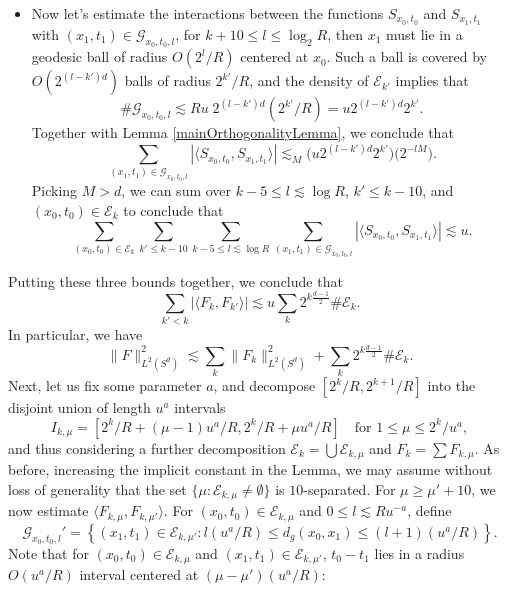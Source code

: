 \begin{itemize}
    \item Now let's estimate the interactions between the functions ${S\!}_{x_0,t_0}$ and ${S\!}_{x_1,t_1}$ with $(x_1,t_1) \in \mathcal{G}_{x_0,t_0,l}$, for $k + 10 \leq l \leq \log_2 R$, then $x_1$ must lie in a geodesic ball of radius $O(2^l/R)$ centered at $x_0$. Such a ball is covered by $O( 2^{(l-k')d} )$ balls of radius $2^{k'}/R$, and the density of $\mathcal{E}_{k'}$ implies that
    \[ \# \mathcal{G}_{x_0,t_0,l} \lesssim Ru\; 2^{(l-k')d} (2^{k'}/R) = u 2^{(l-k')d} 2^{k'}. \]
    Together with Lemma \ref{mainOrthogonalityLemma}, we conclude that
    \[ \sum_{(x_1,t_1) \in \mathcal{G}_{x_0,t_0,l}} |\langle {S\!}_{x_0,t_0}, {S\!}_{x_1,t_1} \rangle| \lesssim_M \Big( u 2^{(l-k')d} 2^{k'} \Big) \Big( 2^{-lM} \Big). \]
    Picking $M > d$, we can sum over $k - 5 \leq l \lesssim \log R$, $k' \leq k - 10$, and $(x_0,t_0) \in \mathcal{E}_k$ to conclude that
    \[ \sum_{(x_0,t_0) \in \mathcal{E}_k} \sum_{k' \leq k - 10} \sum_{k-5 \leq l \lesssim \log R} \sum_{(x_1,t_1) \in \mathcal{G}_{x_0,t_0,l}} |\langle {S\!}_{x_0,t_0}, {S\!}_{x_1,t_1} \rangle| \lesssim u. \]
\end{itemize}
%
Putting these three bounds together, we conclude that
%
\[ \sum_{k' < k} |\langle F_k, F_{k'} \rangle| \lesssim u \sum_k 2^{k \frac{d-1}{2}} \# \mathcal{E}_k. \]
%
In particular, we have
%
\[ \| F \|_{L^2(S^d)}^2 \lesssim \sum_k \| F_k \|_{L^2(S^d)}^2 + \sum_k 2^{k \frac{d-1}{2}} \# \mathcal{E}_k. \]
%
Next, let us fix some parameter $a$, and decompose $[2^k/R, 2^{k+1}/R]$ into the disjoint union of length $u^a$ intervals
%
\[ I_{k,\mu} = [ 2^k / R + (\mu - 1) u^a / R, 2^k / R + \mu u^a / R] \quad\text{for $1 \leq \mu \leq 2^k/u^a$}, \]
%
and thus considering a further decomposition $\mathcal{E}_k = \bigcup \mathcal{E}_{k,\mu}$ and $F_k = \sum F_{k,\mu}$. As before, increasing the implicit constant in the Lemma, we may assume without loss of generality that the set $\{ \mu: \mathcal{E}_{k,\mu} \neq \emptyset \}$ is $10$-separated. For $\mu \geq \mu' + 10$, we now estimate $\langle F_{k,\mu}, F_{k,\mu'} \rangle$. For $(x_0,t_0) \in \mathcal{E}_{k,\mu}$ and $0 \leq l \lesssim R u^{-a}$, define
%
\[ \mathcal{G}_{x_0,t_0,l}' = \left\{ (x_1,t_1) \in \mathcal{E}_{k,\mu'} : l(u^a / R) \leq d_g(x_0,x_1) \leq (l+1)(u^a/R) \right\}. \]
%
Note that for $(x_0,t_0) \in \mathcal{E}_{k,\mu}$ and $(x_1,t_1) \in \mathcal{E}_{k,\mu'}$, $t_0 - t_1$ lies in a radius $O(u^a / R)$ interval centered at $(\mu - \mu') (u^a / R)$:
%
